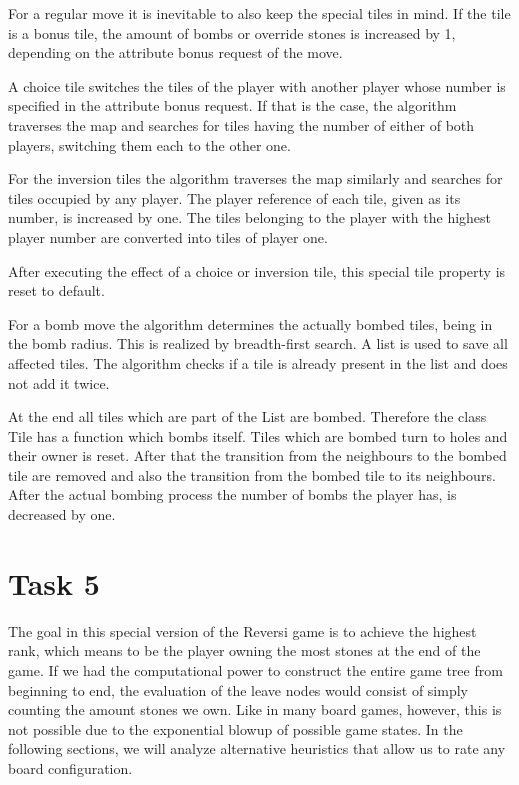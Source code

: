 For a regular move it is inevitable to also keep the special tiles in mind. If the tile is a bonus tile, the amount of bombs or override stones is increased by 1, depending on the attribute bonus request of the move.

A choice tile switches the tiles of the player with another player whose number is specified in the attribute bonus request. If that is the case, the algorithm traverses the map and searches for tiles having the number of either of both players, switching them each to the other one.

For the inversion tiles the algorithm traverses the map similarly and searches for tiles occupied by any player. The player reference of each tile, given as its number, is increased by one. The tiles belonging to the player with the highest player number are converted into tiles of player one.

After executing the effect of a choice or inversion tile, this special tile property is reset to default.

For a bomb move the algorithm determines the actually bombed tiles, being in the bomb radius. This is realized by breadth-first search. A list is used to save all affected tiles. The algorithm checks if a tile is already present in the list and does not add it twice.

At the end all tiles which are part of the List are bombed. Therefore the class Tile has a function which bombs itself. Tiles which are bombed turn to holes and their owner is reset. After that the transition from the neighbours to the bombed tile are removed and also the transition from the bombed tile to its neighbours. After the actual bombing process the number of bombs the player has, is decreased by one.

\section{Task 5}

The goal in this special version of the Reversi game is to achieve the highest rank, which means to be the player owning the most stones at the end of the game. If we had the computational power to construct the entire game tree from beginning to end, the evaluation of the leave nodes would consist of simply counting the amount stones we own. Like in many board games, however, this is not possible due to the exponential blowup of possible game states. In the following sections, we will analyze alternative heuristics that allow us to rate any board configuration.

